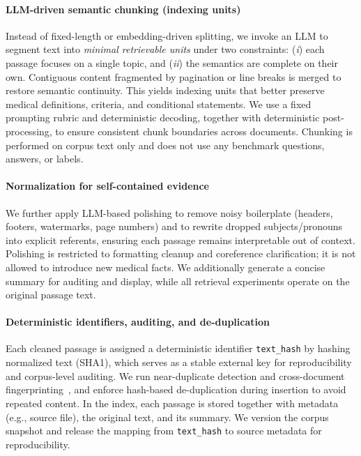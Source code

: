 \documentclass[preprint,12pt,a4paper]{elsarticle}
\begin{document}
\paragraph{LLM-driven semantic chunking (indexing units)}
Instead of fixed-length or embedding-driven splitting, we invoke an LLM to segment text into \emph{minimal retrievable units} under two constraints:
(\textit{i}) each passage focuses on a single topic, and (\textit{ii}) the semantics are complete on their own.
Contiguous content fragmented by pagination or line breaks is merged to restore semantic continuity.
This yields indexing units that better preserve medical definitions, criteria, and conditional statements.
We use a fixed prompting rubric and deterministic decoding, together with deterministic post-processing, to ensure consistent chunk boundaries across documents.
Chunking is performed on corpus text only and does not use any benchmark questions, answers, or labels.

\paragraph{Normalization for self-contained evidence}
We further apply LLM-based polishing to remove noisy boilerplate (headers, footers, watermarks, page numbers) and to rewrite dropped subjects/pronouns into explicit referents, ensuring each passage remains interpretable out of context.
Polishing is restricted to formatting cleanup and coreference clarification; it is not allowed to introduce new medical facts.
We additionally generate a concise summary for auditing and display, while all retrieval experiments operate on the original passage text.

\paragraph{Deterministic identifiers, auditing, and de-duplication}
Each cleaned passage is assigned a deterministic identifier \texttt{text\_hash} by hashing normalized text (SHA1),
which serves as a stable external key for reproducibility and corpus-level auditing.
We run near-duplicate detection and cross-document fingerprinting~\cite{broder1997minhash,charikar2002simhash,indyk1998lsh},
and enforce hash-based de-duplication during insertion to avoid repeated content.
In the index, each passage is stored together with metadata (e.g., source file), the original text, and its summary.
We version the corpus snapshot and release the mapping from \texttt{text\_hash} to source metadata for reproducibility.
\end{document}
